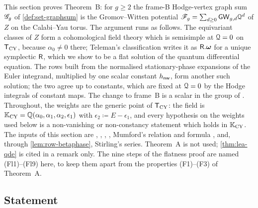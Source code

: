 This section proves Theorem~B: for $g\geq 2$ the frame-B Hodge-vertex graph sum $\mathscr{G}_g$ of \cref{def:set-graphsum} is the Gromov--Witten potential $\mathscr{F}_g=\sum_{d\geq 0}\mathsf{GW}_{g,d}\mathcal{Q}^d$ of $Z$ on the Calabi--Yau torus. The argument runs as follows. The equivariant classes of $Z$ form a cohomological field theory which is semisimple at $\mathcal{Q}=0$ on $\mathsf{T}_{\mathrm{CY}}$, because $\alpha_0\neq 0$ there; Teleman's classification writes it as $\mathsf{R}.\boldsymbol{\omega}$ for a unique symplectic $\mathsf{R}$, which we show to be a flat solution of the quantum differential equation. The rows built from the normalised stationary-phase expansions of the Euler integrand, multiplied by one scalar constant $h_{\mathsf{nw}}$, form another such solution; the two agree up to constants, which are fixed at $\mathcal{Q}=0$ by the Hodge integrals of constant maps. The change to frame~B is a scalar in the group of \cite{PPZ15}. Throughout, the weights are the generic point of $\mathsf{T}_{\mathrm{CY}}$: the field is $\mathbb{K}_{\mathrm{CY}}=\mathbb{Q}(\alpha_0,\alpha_1,\alpha_2,\epsilon_1)$ with $\epsilon_2\coloneqq E-\epsilon_1$, and every hypothesis on the weights used below is a non-vanishing or non-constancy statement which holds in $\mathbb{K}_{\mathrm{CY}}$. The inputs of this section are \cite{Tel12}, \cite{PPZ15}, \cite{GP99}, \cite{CG07}, Mumford's relation and formula \cite{Mum83,FP00}, \cite[Theorem~4, p.~3]{FP00} and, through \cref{lem:row-betaphase}, Stirling's series. Theorem~A is not used; \cref{thm:lea-qde} is cited in a remark only. The nine steps of the flatness proof are named (Fl1)--(Fl9) here, to keep them apart from the properties (F1)--(F3) of Theorem~A.

\subsection{Statement}

